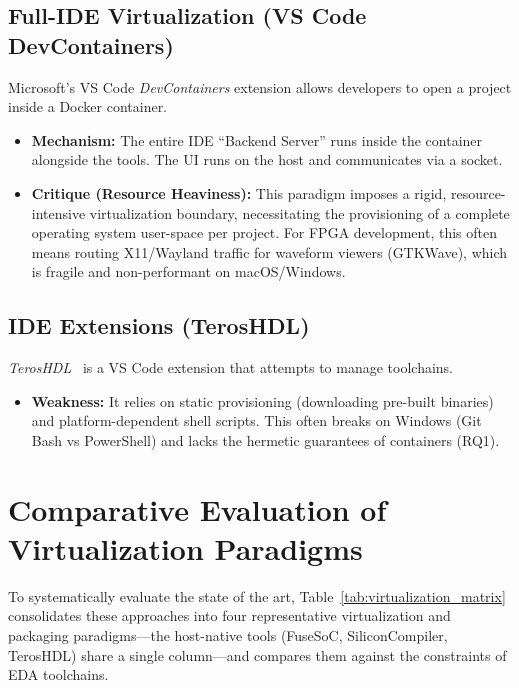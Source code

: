\subsection{Full-IDE Virtualization (VS Code DevContainers)}
Microsoft's VS Code \textit{DevContainers} extension allows developers to open a project inside a Docker container.
\begin{itemize}
    \item \textbf{Mechanism:} The entire IDE ``Backend Server'' runs inside the container alongside the tools. The UI runs on the host and communicates via a socket.
    \item \textbf{Critique (Resource Heaviness):} This paradigm imposes a rigid, resource-intensive virtualization boundary, necessitating the provisioning of a complete operating system user-space per project. For FPGA development, this often means routing X11/Wayland traffic for waveform viewers (GTKWave), which is fragile and non-performant on macOS/Windows.
\end{itemize}

\subsection{IDE Extensions (TerosHDL)}
\textit{TerosHDL}~\cite{teroshdl} is a VS Code extension that attempts to manage toolchains.
\begin{itemize}
    \item \textbf{Weakness:} It relies on static provisioning (downloading pre-built binaries) and platform-dependent shell scripts. This often breaks on Windows (Git Bash vs PowerShell) and lacks the hermetic guarantees of containers (RQ1).
\end{itemize}

\section{Comparative Evaluation of Virtualization Paradigms}
To systematically evaluate the state of the art, Table~\ref{tab:virtualization_matrix} consolidates these approaches into four representative virtualization and packaging paradigms---the host-native tools (FuseSoC, SiliconCompiler, TerosHDL) share a single column---and compares them against the constraints of EDA toolchains.

